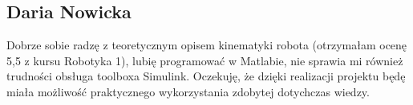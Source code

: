 \subsection{Daria Nowicka}
Dobrze sobie radzę z teoretycznym opisem kinematyki robota (otrzymałam ocenę 5,5 z kursu Robotyka 1), lubię programować w Matlabie, nie sprawia mi również trudności obsługa toolboxa Simulink. Oczekuję, że dzięki realizacji projektu będę miała możliwość praktycznego wykorzystania zdobytej dotychczas wiedzy.